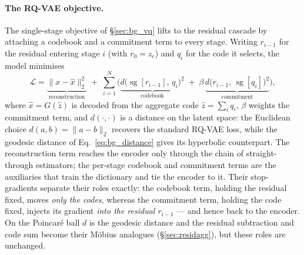 \documentclass[12pt]{report}
\begin{document}
\paragraph{The RQ-VAE objective.}
The single-stage objective of \S\ref{sec:bg_vq} lifts to the residual cascade by attaching a codebook and a commitment term to every stage. Writing $r_{i-1}$ for the residual entering stage $i$ (with $r_0=z_e$) and $q_i$ for the code it selects, the model minimises
\begin{equation}
    \label{eq:rqvae_loss}
    \mathcal{L} = \underbrace{\lVert x - \hat x\rVert_2^2}_{\text{reconstruction}}
    \;+\; \sum_{i=1}^{N}\Big(
    \underbrace{d\big(\operatorname{sg}[r_{i-1}],\, q_i\big)^2}_{\text{codebook}}
    \;+\; \beta\,\underbrace{d\big(r_{i-1},\, \operatorname{sg}[q_i]\big)^2}_{\text{commitment}}
    \Big),
\end{equation}
where $\hat x = G(\hat z)$ is decoded from the aggregate code $\hat z = \sum_i q_i$, $\beta$ weights the commitment term, and $d(\cdot,\cdot)$ is a distance on the latent space: the Euclidean choice $d(a,b)=\lVert a-b\rVert_2$ recovers the standard RQ-VAE loss, while the geodesic distance of Eq.~\ref{eq:bg_distance} gives its hyperbolic counterpart. The reconstruction term reaches the encoder only through the chain of straight-through estimators; the per-stage codebook and commitment terms are the auxiliaries that train the dictionary and tie the encoder to it. Their stop-gradients separate their roles exactly: the codebook term, holding the residual fixed, moves \emph{only the codes}, whereas the commitment term, holding the code fixed, injects its gradient \emph{into the residual} $r_{i-1}$ --- and hence back to the encoder. On the Poincar\'e ball $d$ is the geodesic distance and the residual subtraction and code sum become their M\"obius analogues (\S\ref{sec:residagg}), but these roles are unchanged.
\end{document}
